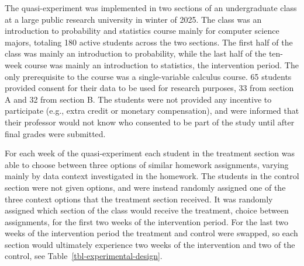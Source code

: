 \documentclass[
  12pt]{article}
\begin{document}
The quasi-experiment was implemented in two sections of an undergraduate
class at a large public research university in winter of 2025. The class
was an introduction to probability and statistics course mainly for
computer science majors, totaling 180 active students across the two
sections. The first half of the class was mainly an introduction to
probability, while the last half of the ten-week course was mainly an
introduction to statistics, the intervention period. The only
prerequisite to the course was a single-variable calculus course. 65
students provided consent for their data to be used for research
purposes, 33 from section A and 32 from section B. The students were not
provided any incentive to participate (e.g., extra credit or monetary
compensation), and were informed that their professor would not know who
consented to be part of the study until after final grades were
submitted.

For each week of the quasi-experiment each student in the treatment
section was able to choose between three options of similar homework
assignments, varying mainly by data context investigated in the
homework. The students in the control section were not given options,
and were instead randomly assigned one of the three context options that
the treatment section received. It was randomly assigned which section
of the class would receive the treatment, choice between assignments,
for the first two weeks of the intervention period. For the last two
weeks of the intervention period the treatment and control were swapped,
so each section would ultimately experience two weeks of the
intervention and two of the control, see
Table~\ref{tbl-experimental-design}.
\end{document}
